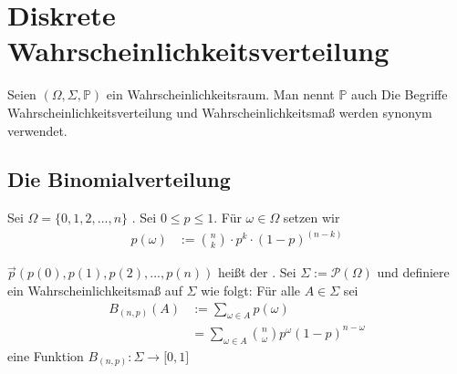 \section{Diskrete Wahrscheinlichkeitsverteilung}
Seien $(\Omega, \Sigma,\mathbb P)$ ein Wahrscheinlichkeitsraum. Man nennt $\mathbb P$ auch  %
Die Begriffe Wahrscheinlichkeitsverteilung und Wahrscheinlichkeitsmaß werden synonym verwendet.

\subsection{Die Binomialverteilung}
Sei $\Omega = \{0,1,2, ..., n \}$ . Sei $0 \leq p \leq 1$. Für $\omega \in \Omega$ setzen wir 
\begin{align*}
p(\omega) &:= \binom{n}{k} \cdot p^k \cdot (1-p)^(n-k) 
\end{align*}

$\vec{p}(p(0),p(1),p(2),...,p(n))$ heißt der . Sei $\Sigma := \mathcal P(\Omega)$ und definiere %
ein Wahrscheinlichkeitsmaß auf $\Sigma$ wie folgt: 
Für alle $A \in \Sigma$ sei
\begin{align*}
B_{(n,p)}(A) &:= \sum\limits_{\omega \in A} p(\omega) \\
	&= \sum\limits_{\omega \in A} \binom{n}{\omega}p^\omega(1-p)^{n-\omega}
\end{align*}
eine Funktion $B_{(n,p)}: \Sigma \rightarrow \lbrack 0,1 \rbrack$

